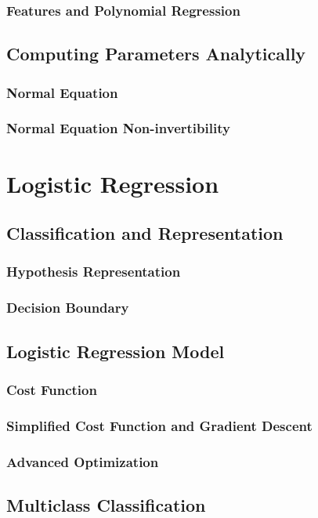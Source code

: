 \documentclass{article}
\begin{document}
\subsubsection{Features and Polynomial Regression}
\subsection{Computing Parameters Analytically}
\subsubsection{Normal Equation}
\subsubsection{Normal Equation Non-invertibility}

\section{Logistic Regression}
\subsection{Classification and Representation}
\subsubsection{Hypothesis Representation}
\subsubsection{Decision Boundary}
\subsection{Logistic Regression Model}
\subsubsection{Cost Function}
\subsubsection{Simplified Cost Function and Gradient Descent}
\subsubsection{Advanced Optimization}
\subsection{Multiclass Classification}
\end{document}

